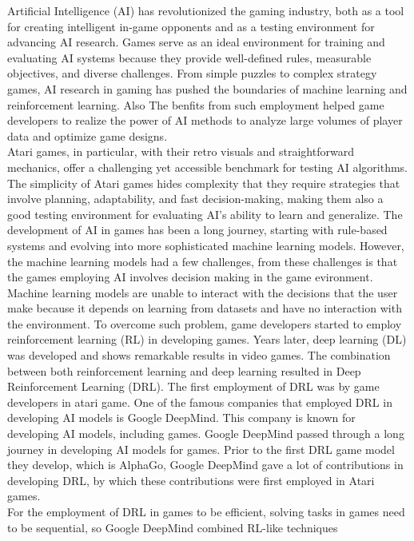 Artificial Intelligence (AI) has revolutionized the gaming industry, both as a
tool for creating intelligent in-game opponents and as a testing environment
for advancing AI research. Games serve as an ideal environment for training and
evaluating AI systems because they provide well-defined rules, measurable
objectives, and diverse challenges. From simple puzzles to complex strategy
games, AI research in gaming has pushed the boundaries of machine learning and
reinforcement learning. Also The benfits from such employment helped game
developers to realize the power of AI methods to analyze large volumes of
player data and optimize game designs. \cite{I1} \\ Atari games, in particular,
with their retro visuals and straightforward mechanics, offer a challenging yet
accessible benchmark for testing AI algorithms. The simplicity of Atari games
hides complexity that they require strategies that involve planning,
adaptability, and fast decision-making, making them also a good testing
environment for evaluating AI's ability to learn and generalize. The
development of AI in games has been a long journey, starting with rule-based
systems and evolving into more sophisticated machine learning models. However,
the machine learning models had a few challenges, from these challenges is that
the games employing AI involves decision making in the game evironment. Machine
learning models are unable to interact with the decisions that the user make
because it depends on learning from datasets and have no interaction with the
environment. To overcome such problem, game developers started to employ
reinforcement learning (RL) in developing games. Years later, deep learning
(DL) was developed and shows remarkable results in video games\cite{I2}. The
combination between both reinforcement learning and deep learning resulted in
Deep Reinforcement Learning (DRL). The first employment of DRL was by game
developers in atari game\cite{I3}. One of the famous companies that employed
DRL in developing AI models is Google DeepMind. This company is known for
developing AI models, including games. Google DeepMind passed through a long
journey in developing AI models for games. Prior to the first DRL game model
they develop, which is AlphaGo, Google DeepMind gave a lot of contributions in
developing DRL, by which these contributions were first employed in Atari
games.\\ For the employment of DRL in games to be efficient, solving tasks in
games need to be sequential, so Google DeepMind combined RL-like techniques
